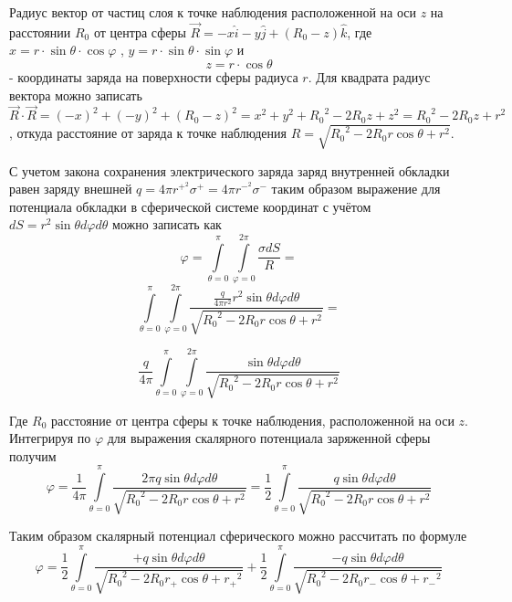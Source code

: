 ﻿\documentclass[12pt, letterpaper]{article}
\begin{document}
Радиус вектор от частиц слоя к точке наблюдения расположенной на оси $z$ на расстоянии ${{R}_{0}}$ от центра сферы $\overrightarrow{R}=-x\widehat{i}-y\widehat{j}+\left( {{R}_{0}}-z \right)\widehat{k}$, где $x=r\cdot \sin \theta \cdot \cos \varphi $ , $y=r\cdot \sin \theta \cdot \sin \varphi $ и \[z=r\cdot \cos \theta \] - координаты заряда на поверхности сферы радиуса $r$. Для квадрата радиус вектора можно записать $\overrightarrow{R}\cdot \overrightarrow{R}={{\left( -x \right)}^{2}}+{{\left( -y \right)}^{2}}+{{\left( {{R}_{0}}-z \right)}^{2}}={{x}^{2}}+{{y}^{2}}+{{R}_{0}}^{2}-2{{R}_{0}}z+{{z}^{2}}={{R}_{0}}^{2}-2{{R}_{0}}z+{{r}^{2}}$, откуда расстояние от заряда к точке наблюдения $R=\sqrt{{{R}_{0}}^{2}-2{{R}_{0}}r\cos \theta +{{r}^{2}}}$.

С учетом закона сохранения электрического заряда заряд внутренней обкладки равен заряду внешней $q=4\pi {{r}^{{{+}^{2}}}}{{\sigma }^{+}}=4\pi {{r}^{{{-}^{2}}}}{{\sigma }^{-}}$ таким образом выражение для потенциала обкладки в сферической системе координат с учётом $dS={{r}^{2}}\sin \theta d\varphi d\theta $  можно записать как
	\[\varphi =\int\limits_{\theta =0}^{\pi }{\int\limits_{\varphi =0}^{2\pi }{\frac{\sigma dS}{R}}} = \]
 \[\int\limits_{\theta =0}^{\pi }{\int\limits_{\varphi =0}^{2\pi }{\frac{\frac{q}{4\pi {{r}^{2}}}{{r}^{2}}\sin \theta d\varphi d\theta }{\sqrt{{{R}_{0}}^{2}-2{{R}_{0}}r\cos \theta +{{r}^{2}}}}}} = \]

 \[\frac{q}{4\pi }\int\limits_{\theta =0}^{\pi }{\int\limits_{\varphi =0}^{2\pi }{\frac{\sin \theta d\varphi d\theta }{\sqrt{{{R}_{0}}^{2}-2{{R}_{0}}r\cos \theta +{{r}^{2}}}}}}\]

Где ${R}_{0}$ расстояние от центра сферы к точке наблюдения, расположенной на оси $z$. Интегрируя по $\varphi$ для выражения скалярного потенциала заряженной сферы получим
	\[\varphi =\frac{1}{4\pi }\int\limits_{\theta =0}^{\pi }{\frac{2\pi q\sin \theta d\varphi d\theta }{\sqrt{{{R}_{0}}^{2}-2{{R}_{0}}r\cos \theta +{{r}^{2}}}}}=\frac{1}{2}\int\limits_{\theta =0}^{\pi }{\frac{q\sin \theta d\varphi d\theta }{\sqrt{{{R}_{0}}^{2}-2{{R}_{0}}r\cos \theta +{{r}^{2}}}}}\] 	

Таким образом скалярный потенциал сферического можно рассчитать по формуле
	\[\varphi =\frac{1}{2}\int\limits_{\theta =0}^{\pi }{\frac{+q\sin \theta d\varphi d\theta }{\sqrt{{{R}_{0}}^{2}-2{{R}_{0}}{{r}_{+}}\cos \theta +{{r}_{+}}^{2}}}}+\frac{1}{2}\int\limits_{\theta =0}^{\pi }{\frac{-q\sin \theta d\varphi d\theta }{\sqrt{{{R}_{0}}^{2}-2{{R}_{0}}{{r}_{-}}\cos \theta +{{r}_{-}}^{2}}}}\]
\end{document}
